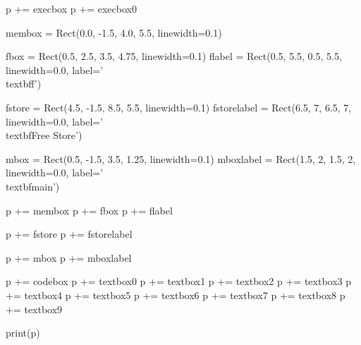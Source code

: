 \begin{python}
p += execbox
p += execbox0

membox = Rect(0.0, -1.5, 4.0, 5.5, linewidth=0.1)

fbox = Rect(0.5, 2.5, 3.5, 4.75, linewidth=0.1)
flabel = Rect(0.5, 5.5, 0.5, 5.5, linewidth=0.0, label='\\textbf{f}')

fstore = Rect(4.5, -1.5, 8.5, 5.5, linewidth=0.1)
fstorelabel = Rect(6.5, 7, 6.5, 7, linewidth=0.0, label='\\textbf{Free Store}')

mbox = Rect(0.5, -1.5, 3.5, 1.25, linewidth=0.1)
mboxlabel = Rect(1.5, 2, 1.5, 2, linewidth=0.0, label='\\textbf{main}')

p += membox
p += fbox
p += flabel

p += fstore
p += fstorelabel

p += mbox
p += mboxlabel

p += codebox
p += textbox0
p += textbox1
p += textbox2
p += textbox3
p += textbox4
p += textbox5
p += textbox6
p += textbox7
p += textbox8
p += textbox9

print(p)
\end{python}

